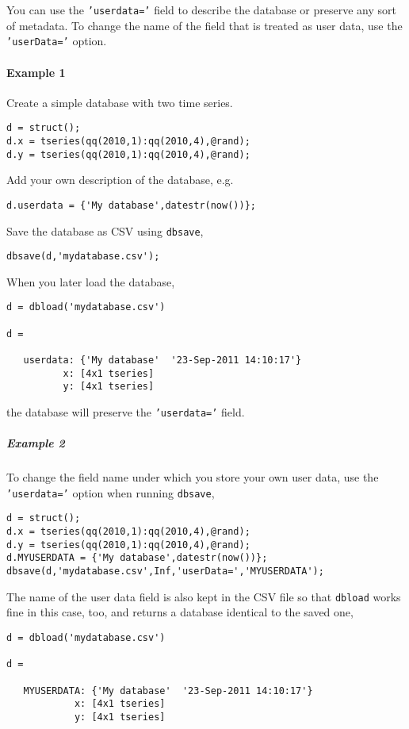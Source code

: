 You can use the \texttt{'userdata='} field to describe the database or
preserve any sort of metadata. To change the name of the field that is
treated as user data, use the \texttt{'userData='} option.

\paragraph{Example 1}\label{example-1}

Create a simple database with two time series.

\begin{verbatim}
d = struct();
d.x = tseries(qq(2010,1):qq(2010,4),@rand);
d.y = tseries(qq(2010,1):qq(2010,4),@rand);
\end{verbatim}

Add your own description of the database, e.g.

\begin{verbatim}
d.userdata = {'My database',datestr(now())};
\end{verbatim}

Save the database as CSV using \texttt{dbsave},

\begin{verbatim}
dbsave(d,'mydatabase.csv');
\end{verbatim}

When you later load the database,

\begin{verbatim}
d = dbload('mydatabase.csv')

d = 

   userdata: {'My database'  '23-Sep-2011 14:10:17'}
          x: [4x1 tseries]
          y: [4x1 tseries]
\end{verbatim}

the database will preserve the \texttt{'userdata='} field.

\subparagraph{Example 2}\label{example-2}

To change the field name under which you store your own user data, use
the \texttt{'userdata='} option when running \texttt{dbsave},

\begin{verbatim}
d = struct();
d.x = tseries(qq(2010,1):qq(2010,4),@rand);
d.y = tseries(qq(2010,1):qq(2010,4),@rand);
d.MYUSERDATA = {'My database',datestr(now())};
dbsave(d,'mydatabase.csv',Inf,'userData=','MYUSERDATA');
\end{verbatim}

The name of the user data field is also kept in the CSV file so that
\texttt{dbload} works fine in this case, too, and returns a database
identical to the saved one,

\begin{verbatim}
d = dbload('mydatabase.csv')

d = 

   MYUSERDATA: {'My database'  '23-Sep-2011 14:10:17'}
            x: [4x1 tseries]
            y: [4x1 tseries]
\end{verbatim}


